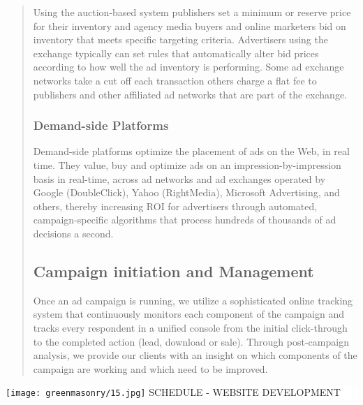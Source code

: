 \documentclass[35pt]{report}
\begin{document}
\begin{quote}
Using the auction-based system publishers set a minimum or reserve price for their inventory and agency media buyers and online marketers bid on inventory that meets specific targeting criteria. Advertisers using the exchange typically can set rules that automatically alter bid prices according to how well the ad inventory is performing. Some ad exchange networks take a cut off each transaction others charge a flat fee to publishers and other affiliated ad networks that are part of the exchange.
		
			\subsubsection{Demand-side Platforms}
Demand-side platforms optimize the placement of ads on the Web, in real time. They value, buy and optimize ads on an impression-by-impression basis in real-time, across ad networks and ad exchanges operated by Google (DoubleClick), Yahoo (RightMedia), Microsoft Advertising, and others, thereby increasing ROI for advertisers through automated, campaign-specific algorithms that process hundreds of thousands of ad decisions a second.

		\subsection{Campaign initiation and Management}
Once an ad campaign is running, we utilize a sophisticated online tracking system that continuously monitors each component of the campaign and tracks every respondent in a unified console from the initial click-through to the completed action (lead, download or sale). Through post-campaign analysis, we provide our clients with an insight on which components of the campaign are working and which need to be improved.
\end{quote}	

\clearpage


\thispagestyle{empty}

\vspace*{2cm}
\colorbox{white}{
	\parbox[t]{1.0\linewidth}{
       	\begin{center} 
			\fontsize{40pt}{11pt}\selectfont 
			\vspace*{.5cm}
				{\texttt{[image: greenmasonry/15.jpg]}}
				{SCHEDULE - WEBSITE DEVELOPMENT}
			\vspace*{.5cm}
		\end{center}
	}
}
\clearpage
\end{document}
